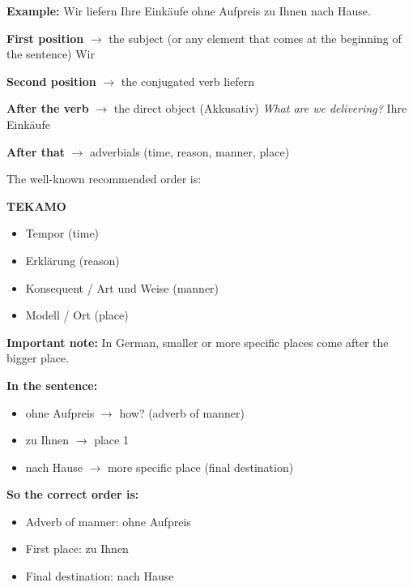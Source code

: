 
\textbf{Example:}
Wir liefern Ihre Einkäufe ohne Aufpreis zu Ihnen nach Hause.

\bigskip

\textbf{First position} $\rightarrow$ the subject (or any element that comes at the beginning of the sentence)
Wir

\textbf{Second position} $\rightarrow$ the conjugated verb
liefern

\textbf{After the verb} $\rightarrow$ the direct object (Akkusativ)
\textit{What are we delivering?}
Ihre Einkäufe

\textbf{After that} $\rightarrow$ adverbials (time, reason, manner, place)

\bigskip

The well-known recommended order is:

\textbf{TEKAMO}
\begin{itemize}
    \item Tempor (time)
    \item Erklärung (reason)
    \item Konsequent / Art und Weise (manner)
    \item Modell / Ort (place)
\end{itemize}

\bigskip

\textbf{Important note:}
In German, smaller or more specific places come after the bigger place.

\bigskip

\textbf{In the sentence:}
\begin{itemize}
    \item ohne Aufpreis $\rightarrow$ how? (adverb of manner)
    \item zu Ihnen $\rightarrow$ place 1
    \item nach Hause $\rightarrow$ more specific place (final destination)
\end{itemize}

\bigskip

\textbf{So the correct order is:}

\begin{itemize}
    \item Adverb of manner: ohne Aufpreis
    \item First place: zu Ihnen
    \item Final destination: nach Hause
\end{itemize}
